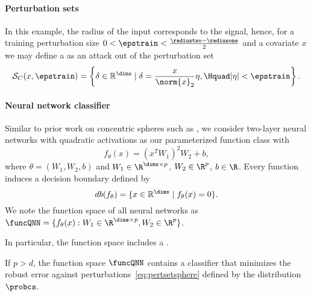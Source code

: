 \paragraph{Perturbation sets}
In this example, the radius of the input corresponds to the signal,
hence, for a training perturbation size $0< \epstrain <
\frac{\radiustwo-\radiusone}{2}$ and a covariate $x$ we may define
a \nameofattack as an attack out of the perturbation set
\begin{equation}
  \label{eq:pertsetsphere}
    \mathcal{S}_C(x, \epstrain) = \left\{\delta \in \mathbb{R}^{\dims} \mid \delta = \frac{x}{\norm{x}_2}\eta, \Hquad |\eta|<\epstrain\right\}.
\end{equation}

\paragraph{Neural network classifier}
Similar to prior work on concentric spheres such as \cite{gilmer18},
we consider two-layer neural networks with quadratic activations as
our parameterized function class with
\begin{equation*}
    f_\theta(x) = \left(x^T W_1 \right)^2 W_2 + b,
\end{equation*}
where $\theta =(W_1 , W_2,b)$ and $W_1 \in \R^{\dims \times p}$, $ W_2 \in \R^p$, $b\in \R$. Every function induces a decision boundary defined by
\begin{equation}
  \label{eq:decisionboundary}
  db(f_\theta) = \{x \in \mathbb{R}^{\dims} \mid f_{\theta}(x) = 0\}.
\end{equation} 
 We note the function space of all neural networks as
$\funcQNN = \{f_\theta(x): W_1 \in \R^{\dims \times p}, W_2 \in
\R^p\}$.



In particular, the function space includes a .
\begin{lemma}
  If $p>d$, the function space $\funcQNN$ contains a classifier that minimizes the robust error against perturbations~\eqref{eq:pertsetsphere} defined by the distribution $\probcs$.
\end{lemma}

